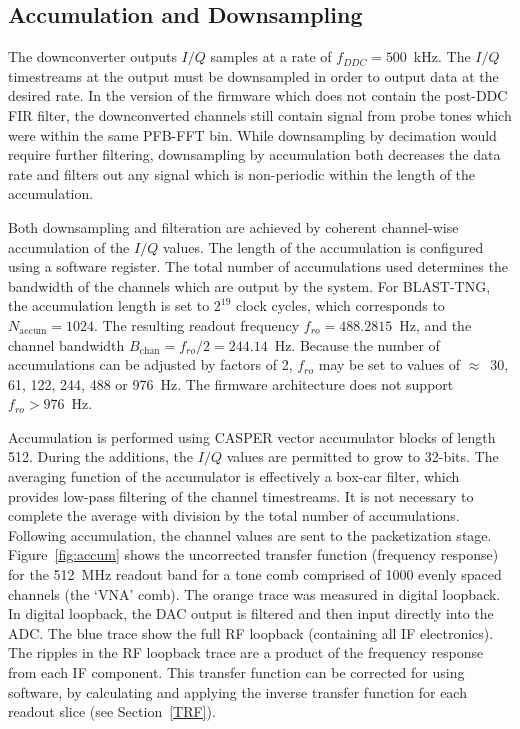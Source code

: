 \subsection{Accumulation and Downsampling}\label{accum}

The downconverter outputs $I/Q$ samples at a rate of $f_{DDC} = 500$~kHz. The $I/Q$ timestreams at the output must be downsampled in order to output data at the desired rate. In the version of the firmware which does not contain the post-DDC FIR filter, the downconverted channels still contain signal from probe tones which were within the same PFB-FFT bin. While downsampling by decimation would require further filtering, downsampling by accumulation both decreases the data rate and filters out any signal which is non-periodic within the length of the accumulation.

Both downsampling and filteration are achieved by coherent channel-wise accumulation of the $I/Q$ values. The length of the accumulation is configured using a software register. The total number of accumulations used determines the bandwidth of the channels which are output by the system. For BLAST-TNG, the accumulation length is set to $2^{19}$ clock cycles, which corresponds to $N_{\mathrm{accum}} = 1024$. The resulting readout frequency $f_{ro} = 488.2815$~Hz, and the channel bandwidth $B_{\mathrm{chan}} = f_{ro}/2 = 244.14$~Hz. Because the number of accumulations can be adjusted by factors of 2, $f_{ro}$ may be set to values of $\approx$~30, 61, 122, 244, 488 or 976~Hz. The firmware architecture does not support $f_{ro} > 976$~Hz.

Accumulation is performed using CASPER vector accumulator blocks of length 512. During the additions, the $I/Q$ values are permitted to grow to 32-bits. The averaging function of the accumulator is effectively a box-car filter, which provides low-pass filtering of the channel timestreams. It is not necessary to complete the average with division by the total number of accumulations. Following accumulation, the channel values are sent to the packetization stage. Figure~\ref{fig:accum} shows the uncorrected transfer function (frequency response) for the 512~MHz readout band for a tone comb comprised of 1000 evenly spaced channels (the `VNA' comb). The orange trace was measured in digital loopback. In digital loopback, the DAC output is filtered and then input directly into the ADC. The blue trace show the full RF loopback (containing all IF electronics). The ripples in the RF loopback trace are a product of the frequency response from each IF component. This transfer function can be corrected for using software, by calculating and applying the inverse transfer function for each readout slice (see Section~\ref{TRF}).

